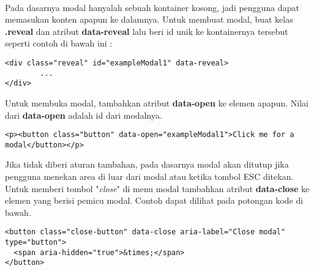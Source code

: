 \paragraph{} Pada dasarnya modal hanyalah sebuah kontainer kosong, jadi pengguna dapat memasukan konten apapun ke dalamnya. Untuk membuat modal, buat kelas \textbf{.reveal} dan atribut \textbf{data-reveal} lalu beri id unik ke kontainernya tersebut seperti contoh di bawah ini :
\begin{lstlisting}
<div class="reveal" id="exampleModal1" data-reveal>
  		...
</div>	
\end{lstlisting}
Untuk membuka modal, tambahkan atribut \textbf{data-open} ke elemen apapun. Nilai dari \textbf{data-open} adalah id dari modalnya.
\begin{lstlisting}
<p><button class="button" data-open="exampleModal1">Click me for a modal</button></p>
\end{lstlisting}
Jika tidak diberi aturan tambahan, pada dasarnya modal akan ditutup jika pengguna menekan area di luar dari modal atau ketika tombol ESC ditekan. Untuk memberi tombol "\textit{close}" di menu modal tambahkan atribut \textbf{data-close} ke elemen yang berisi pemicu modal. Contoh dapat dilihat pada potongan kode di bawah.
\begin{lstlisting}
<button class="close-button" data-close aria-label="Close modal" type="button">
  <span aria-hidden="true">&times;</span>
</button>
\end{lstlisting}

